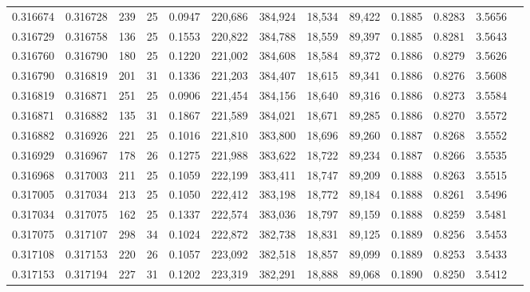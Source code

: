 \begin{tabular}{rrrrrrrrrrrrr}
0.316674 & 0.316728 &   239 &  25 &                                     0.0947 & 220,686 & 384,924 &  18,534 &  89,422 & 0.1885 & 0.8283 & 3.5656 \\
0.316729 & 0.316758 &   136 &  25 &                                     0.1553 & 220,822 & 384,788 &  18,559 &  89,397 & 0.1885 & 0.8281 & 3.5643 \\
0.316760 & 0.316790 &   180 &  25 &                                     0.1220 & 221,002 & 384,608 &  18,584 &  89,372 & 0.1886 & 0.8279 & 3.5626 \\
0.316790 & 0.316819 &   201 &  31 &                                     0.1336 & 221,203 & 384,407 &  18,615 &  89,341 & 0.1886 & 0.8276 & 3.5608 \\
0.316819 & 0.316871 &   251 &  25 &                                     0.0906 & 221,454 & 384,156 &  18,640 &  89,316 & 0.1886 & 0.8273 & 3.5584 \\
0.316871 & 0.316882 &   135 &  31 &                                     0.1867 & 221,589 & 384,021 &  18,671 &  89,285 & 0.1886 & 0.8270 & 3.5572 \\
0.316882 & 0.316926 &   221 &  25 &                                     0.1016 & 221,810 & 383,800 &  18,696 &  89,260 & 0.1887 & 0.8268 & 3.5552 \\
0.316929 & 0.316967 &   178 &  26 &                                     0.1275 & 221,988 & 383,622 &  18,722 &  89,234 & 0.1887 & 0.8266 & 3.5535 \\
0.316968 & 0.317003 &   211 &  25 &                                     0.1059 & 222,199 & 383,411 &  18,747 &  89,209 & 0.1888 & 0.8263 & 3.5515 \\
0.317005 & 0.317034 &   213 &  25 &                                     0.1050 & 222,412 & 383,198 &  18,772 &  89,184 & 0.1888 & 0.8261 & 3.5496 \\
0.317034 & 0.317075 &   162 &  25 &                                     0.1337 & 222,574 & 383,036 &  18,797 &  89,159 & 0.1888 & 0.8259 & 3.5481 \\
0.317075 & 0.317107 &   298 &  34 &                                     0.1024 & 222,872 & 382,738 &  18,831 &  89,125 & 0.1889 & 0.8256 & 3.5453 \\
0.317108 & 0.317153 &   220 &  26 &                                     0.1057 & 223,092 & 382,518 &  18,857 &  89,099 & 0.1889 & 0.8253 & 3.5433 \\
0.317153 & 0.317194 &   227 &  31 &                                     0.1202 & 223,319 & 382,291 &  18,888 &  89,068 & 0.1890 & 0.8250 & 3.5412 \\

\end{tabular}

